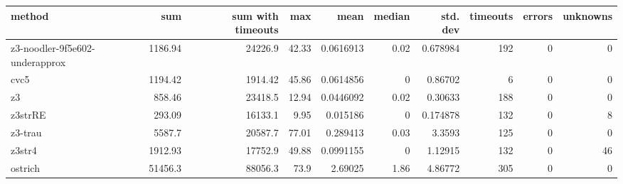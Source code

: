 \begin{tabular}{lrrrrrrrrr}
\hline
 method                         &      sum &   sum with timeouts &   max &      mean &   median &   std. dev &   timeouts &   errors &   unknowns \\
\hline
 z3-noodler-9f5e602-underapprox &  1186.94 &            24226.9  & 42.33 & 0.0616913 &     0.02 &   0.678984 &        192 &        0 &          0 \\
 cvc5                           &  1194.42 &             1914.42 & 45.86 & 0.0614856 &     0    &   0.86702  &          6 &        0 &          0 \\
 z3                             &   858.46 &            23418.5  & 12.94 & 0.0446092 &     0.02 &   0.30633  &        188 &        0 &          0 \\
 z3strRE                        &   293.09 &            16133.1  &  9.95 & 0.015186  &     0    &   0.174878 &        132 &        0 &          8 \\
 z3-trau                        &  5587.7  &            20587.7  & 77.01 & 0.289413  &     0.03 &   3.3593   &        125 &        0 &          0 \\
 z3str4                         &  1912.93 &            17752.9  & 49.88 & 0.0991155 &     0    &   1.12915  &        132 &        0 &         46 \\
 ostrich                        & 51456.3  &            88056.3  & 73.9  & 2.69025   &     1.86 &   4.86772  &        305 &        0 &          0 \\
\hline
\end{tabular}

